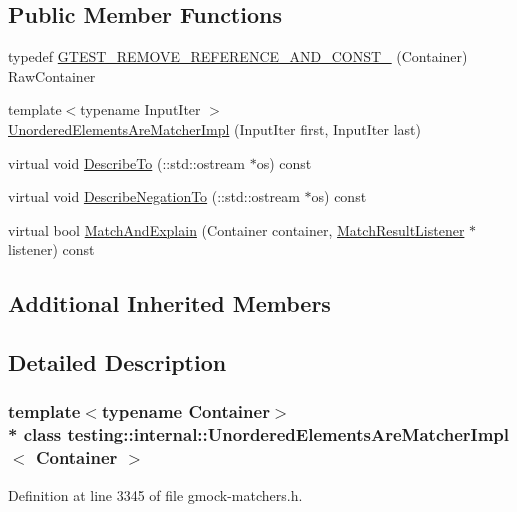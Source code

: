 \subsection*{Public Member Functions}
\begin{DoxyCompactItemize}
\item 
typedef \hyperlink{classtesting_1_1internal_1_1_unordered_elements_are_matcher_impl_a6e8b7d421741a66ee7f2ebff7372897e}{G\+T\+E\+S\+T\+\_\+\+R\+E\+M\+O\+V\+E\+\_\+\+R\+E\+F\+E\+R\+E\+N\+C\+E\+\_\+\+A\+N\+D\+\_\+\+C\+O\+N\+S\+T\+\_\+} (Container) Raw\+Container
\item 
{\footnotesize template$<$typename Input\+Iter $>$ }\\\hyperlink{classtesting_1_1internal_1_1_unordered_elements_are_matcher_impl_a0b0f40cf4de84f14020c3d4c9ba06c42}{Unordered\+Elements\+Are\+Matcher\+Impl} (Input\+Iter first, Input\+Iter last)
\item 
virtual void \hyperlink{classtesting_1_1internal_1_1_unordered_elements_are_matcher_impl_a6dc7d9cefa0717b560cef48db83131bf}{Describe\+To} (\+::std\+::ostream $\ast$os) const 
\item 
virtual void \hyperlink{classtesting_1_1internal_1_1_unordered_elements_are_matcher_impl_af82233b636acbf0e195ede20cd6103f0}{Describe\+Negation\+To} (\+::std\+::ostream $\ast$os) const 
\item 
virtual bool \hyperlink{classtesting_1_1internal_1_1_unordered_elements_are_matcher_impl_aac5710bbfb7e6ae7d69b72ba99b14938}{Match\+And\+Explain} (Container container, \hyperlink{classtesting_1_1_match_result_listener}{Match\+Result\+Listener} $\ast$listener) const 
\end{DoxyCompactItemize}
\subsection*{Additional Inherited Members}


\subsection{Detailed Description}
\subsubsection*{template$<$typename Container$>$\\*
class testing\+::internal\+::\+Unordered\+Elements\+Are\+Matcher\+Impl$<$ Container $>$}



Definition at line 3345 of file gmock-\/matchers.\+h.



